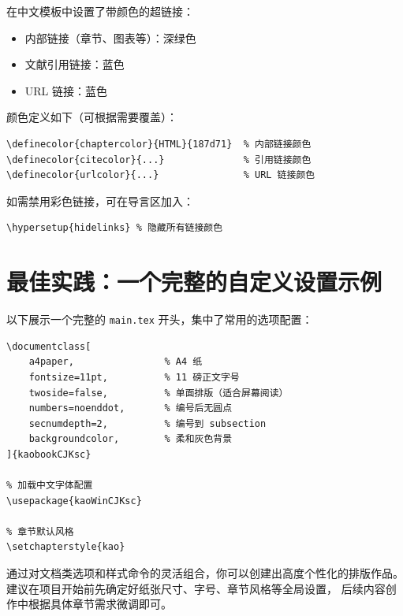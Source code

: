  在中文模板中设置了带颜色的超链接：

\begin{itemize}
    \item 内部链接（章节、图表等）：深绿色
    \item 文献引用链接：蓝色
    \item URL 链接：蓝色
\end{itemize}

颜色定义如下（可根据需要覆盖）：
\begin{lstlisting}
\definecolor{chaptercolor}{HTML}{187d71}  % 内部链接颜色
\definecolor{citecolor}{...}              % 引用链接颜色
\definecolor{urlcolor}{...}               % URL 链接颜色
\end{lstlisting}

如需禁用彩色链接，可在导言区加入：
\begin{lstlisting}
\hypersetup{hidelinks} % 隐藏所有链接颜色
\end{lstlisting}


\section{最佳实践：一个完整的自定义设置示例}

以下展示一个完整的 \texttt{main.tex} 开头，集中了常用的选项配置：

\begin{lstlisting}
\documentclass[
    a4paper,                % A4 纸
    fontsize=11pt,          % 11 磅正文字号
    twoside=false,          % 单面排版（适合屏幕阅读）
    numbers=noenddot,       % 编号后无圆点
    secnumdepth=2,          % 编号到 subsection
    backgroundcolor,        % 柔和灰色背景
]{kaobookCJKsc}

% 加载中文字体配置
\usepackage{kaoWinCJKsc}

% 章节默认风格
\setchapterstyle{kao}
\end{lstlisting}

通过对文档类选项和样式命令的灵活组合，你可以创建出高度个性化的排版作品。
建议在项目开始前先确定好纸张尺寸、字号、章节风格等全局设置，
后续内容创作中根据具体章节需求微调即可。
